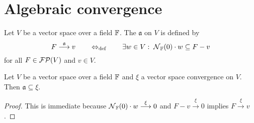 \chapter{Algebraic convergence}
\begin{definition}
Let $V$ be a vector space over a field $\mathbb{F}$. The  $\mathfrak{a}$ on $V$ is defined by
\[ F\overset{\mathfrak{a}}{\longrightarrow} v \quad\quad\Leftrightarrow_{\text{def}}\quad\quad \exists w\in V: \; \operatorname{\mathcal{N}}_{\mathbb{F}}(0)\cdot w \subseteq F - v \]
for all $F\in \operatorname{\mathcal{FP}}(V)$ and $v\in V$.
\end{definition}

\begin{lemma}
Let $V$ be a vector space over a field $\mathbb{F}$ and $\xi$ a vector space convergence on $V$. Then $\mathfrak{a} \subseteq \xi$.
\end{lemma}
\begin{proof}
This is immediate because $\operatorname{\mathcal{N}}_{\mathbb{F}}(0)\cdot w \overset{\xi}{\longrightarrow} 0$ and $F-v\overset{\xi}{\longrightarrow}0$ implies $F\overset{\xi}{\longrightarrow} v$.
\end{proof}

